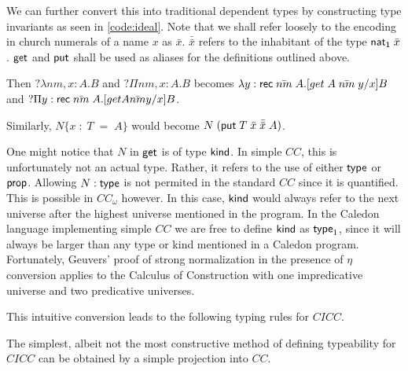 We can further convert this into traditional dependent types by constructing
 type invariants as seen in \ref{code:ideal}.   Note that we shall refer loosely 
to the encoding in church numerals of a name $x$ as $\bar{x}$.  $\bar{\bar{x}}$ refers to the 
inhabitant of the type $\mathsf{nat_1}\;\bar{x}$.   $\mathsf{get}$ and $\mathsf{put}$ shall be used as 
aliases for the definitions outlined above.

Then $?\lambda nm,x : A . B$ and $?\Pi nm,x : A . B$ 
becomes $\lambda y : \mathsf{rec}\;\bar{nm}\;A . [get \;A \;\bar{nm}\; y / x ] B$
and $?\Pi y : \mathsf{rec}\;\bar{nm}\;A . [get A \bar{nm} y / x ] B$.

Similarly, $N \{ x\; : \; T \; = \;A \} $
would become $N\;( \mathsf{put} \; T \; \bar{x} \; \bar{\bar{x}} \; A)$.

One might notice that $N$ in $\mathsf{get}$ is of type $\mathsf{kind}$.  
In simple $CC$, this is unfortunately not an actual type. 
Rather, it refers to the use of either $\mathsf{type}$ or $\mathsf{prop}$.  
Allowing $N : \mathsf{type}$ is not permited in the standard $CC$ since it is quantified.
This is possible in $CC_\omega$ however.
In this case, $\mathsf{kind}$ would always refer to the next universe after the highest
universe mentioned in the program.
In the Caledon language implementing simple $CC$ we are free to define 
$\mathsf{kind}$ as $\mathsf{type}_1$, since it will always be larger than any
type or kind mentioned in a Caledon program.  
Fortunately, Geuvers' proof \citep{geuvers1993logics} of strong normalization in the presence of 
$\eta$ conversion applies to the Calculus of Construction with one impredicative universe and two predicative
universes.

This intuitive conversion leads to the following typing rules for $CICC$.


The simplest, albeit not the most constructive method of defining typeability for $CICC$ can be obtained by a simple projection into $CC$.

\newcommand{\CICCproj}[1]{ \left\llbracket #1 \right\rrbracket_{ci}}

